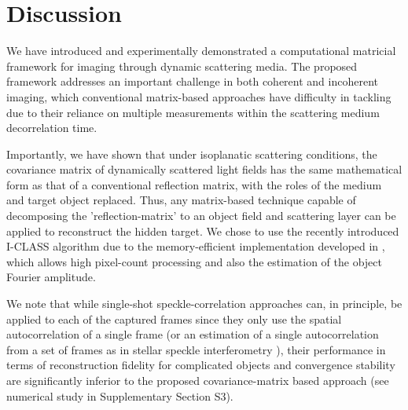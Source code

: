 \documentclass[pdflatex,sn-mathphys-num]{sn-jnl}%
\theoremstyle{thmstyleone}%
\theoremstyle{thmstyletwo}%
\theoremstyle{thmstylethree}%
\begin{document}
\section*{Discussion}

We have introduced and experimentally demonstrated a computational matricial framework for imaging through dynamic scattering media. The proposed framework addresses an important challenge in both coherent and incoherent imaging, which conventional matrix-based approaches have difficulty in tackling due to their reliance on multiple measurements within the scattering medium decorrelation time. 

Importantly, we have shown that under isoplanatic scattering conditions, the covariance matrix of dynamically scattered light fields has the same mathematical form as that of a conventional reflection matrix, with the roles of the medium and target object replaced. 
Thus, any matrix-based technique capable of decomposing the 'reflection-matrix' to an object field and scattering layer can be applied to reconstruct the hidden target. 
We chose to use the recently introduced I-CLASS algorithm due to the memory-efficient implementation developed in \cite{weinberg2023noninvasive,sunray2024beyond}, which allows high pixel-count processing and also the estimation of the object Fourier amplitude.


We note that while single-shot speckle-correlation approaches \cite{katz14} can, in principle, be applied to each of the captured frames since they only use the spatial autocorrelation of a single frame (or an estimation of a single autocorrelation from a set of frames as in stellar speckle interferometry \cite{labeyrie1970attainment}), their performance in terms of reconstruction fidelity for complicated objects and convergence stability are significantly inferior to the proposed covariance-matrix based approach (see numerical study in Supplementary Section S3).

\end{document}
